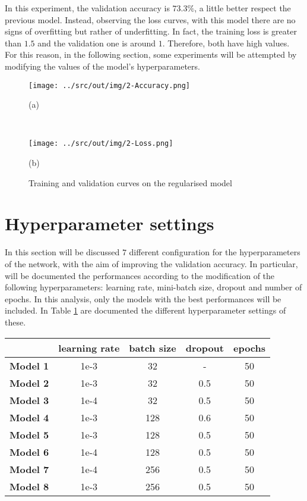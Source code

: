 \documentclass[a4paper,12pt]{article} %
\begin{document}
	In this experiment, the validation accuracy is $73.3\%$, a little better 
	respect the previous model.
	Instead, observing the loss curves, with this model there are no signs of 
	overfitting but rather of underfitting. In fact, the training loss is  
	greater than $1.5$ and the validation one is around $1$. Therefore, both 
	have high values. For this reason, in the following section, some 
	experiments will be attempted by modifying the values of the model's 
	hyperparameters.
	
	\begin{figure}[htb]
		\begin{minipage}[c]{.49\textwidth}
			\centering
			\texttt{[image: ../src/out/img/2-Accuracy.png]}
			\caption*{(a)}
		\end{minipage}
		~
		\begin{minipage}[c]{.49\textwidth}
			\centering
			\texttt{[image: ../src/out/img/2-Loss.png]}
			\caption*{(b)}
		\end{minipage}
		\caption{Training and validation curves on the regularised model}
		\label{fig:model1-performance}
	\end{figure}
	  
	\section{Hyperparameter settings}
	\label{section:hyperparam}
	
	In this section will be discussed $7$ different configuration for the 
	hyperparameters of the network, with the aim of improving the validation 
	accuracy. In particular, will be documented the performances according to 
	the modification of the following hyperparameters: learning rate, 
	mini-batch size, dropout and number of epochs. In this analysis, only the 
	models with the best performances will be included. In Table 
	\ref{tab:param1} are documented the different hyperparameter settings of 
	these. 
	
	\begin{table}[htb]
		\centering
		\begin{tabular}{l@{\hspace{.5cm}}cccc}
			\toprule
			& \textbf{learning rate} & \textbf{batch size} & \textbf{dropout} & 
			\textbf{epochs} \\
			\midrule
			\textbf{Model 1}  & {1e-3} & {32}  &  -  & 50\\
			\textbf{Model 2}  & {1e-3} & {32}  & 0.5 & 50\\
			\textbf{Model 3}  & {1e-4} & {32}  & 0.5 & 50 \\
			\textbf{Model 4}  & {1e-3} & {128} & 0.6 & 50 \\
			\textbf{Model 5}  & {1e-3} & {128} & 0.5 & 50 \\
			\textbf{Model 6} & {1e-4} & {128} & 0.5 & 50 \\
			\textbf{Model 7}  & {1e-4} & {256} & 0.5 & 50 \\
			\textbf{Model 8}  & {1e-3} & {256} & 0.5 & 50 \\
			\bottomrule 
		\end{tabular}
		\label{tab:param1}
	\end{table}
\end{document}
